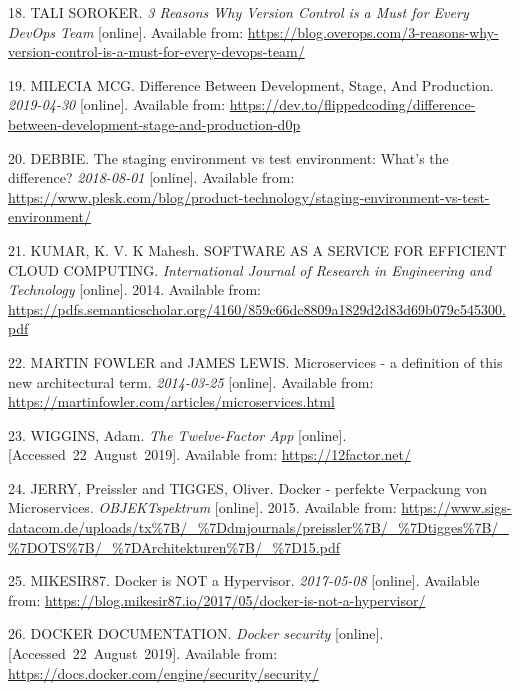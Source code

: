 \documentclass[12pt,english,a4paper,oneside,,tablecaptionabove]{scrbook}
\begin{document}
\leavevmode\hypertarget{ref-TaliSoroker}{}%
18. TALI SOROKER. \emph{3 Reasons Why Version Control is a Must for
Every DevOps Team} {[}online{]}. Available from:
\url{https://blog.overops.com/3-reasons-why-version-control-is-a-must-for-every-devops-team/}

\leavevmode\hypertarget{ref-MileciaMcG}{}%
19. MILECIA MCG. Difference Between Development, Stage, And Production.
\emph{2019-04-30} {[}online{]}. Available from:
\url{https://dev.to/flippedcoding/difference-between-development-stage-and-production-d0p}

\leavevmode\hypertarget{ref-Debbie}{}%
20. DEBBIE. The staging environment vs test environment: What's the
difference? \emph{2018-08-01} {[}online{]}. Available from:
\url{https://www.plesk.com/blog/product-technology/staging-environment-vs-test-environment/}

\leavevmode\hypertarget{ref-Kumar2014}{}%
21. KUMAR, K. V. K Mahesh. SOFTWARE AS A SERVICE FOR EFFICIENT CLOUD
COMPUTING. \emph{International Journal of Research in Engineering and
Technology} {[}online{]}. 2014. Available from:
\url{https://pdfs.semanticscholar.org/4160/859c66dc8809a1829d2d83d69b079c545300.pdf}

\leavevmode\hypertarget{ref-MartinFowler}{}%
22. MARTIN FOWLER and JAMES LEWIS. Microservices - a definition of this
new architectural term. \emph{2014-03-25} {[}online{]}. Available from:
\url{https://martinfowler.com/articles/microservices.html}

\leavevmode\hypertarget{ref-Wiggins}{}%
23. WIGGINS, Adam. \emph{The Twelve-Factor App} {[}online{]}.
{[}Accessed~22~August~2019{]}. Available from:
\url{https://12factor.net/}

\leavevmode\hypertarget{ref-Jerry2015}{}%
24. JERRY, Preissler and TIGGES, Oliver. Docker - perfekte Verpackung
von Microservices. \emph{OBJEKTspektrum} {[}online{]}. 2015. Available
from:
\url{https://www.sigs-datacom.de/uploads/tx\%7B/_\%7Ddmjournals/preissler\%7B/_\%7Dtigges\%7B/_\%7DOTS\%7B/_\%7DArchitekturen\%7B/_\%7D15.pdf}

\leavevmode\hypertarget{ref-Mikesir87}{}%
25. MIKESIR87. Docker is NOT a Hypervisor. \emph{2017-05-08}
{[}online{]}. Available from:
\url{https://blog.mikesir87.io/2017/05/docker-is-not-a-hypervisor/}

\leavevmode\hypertarget{ref-DockerDocumentation}{}%
26. DOCKER DOCUMENTATION. \emph{Docker security} {[}online{]}.
{[}Accessed~22~August~2019{]}. Available from:
\url{https://docs.docker.com/engine/security/security/}
\end{document}
